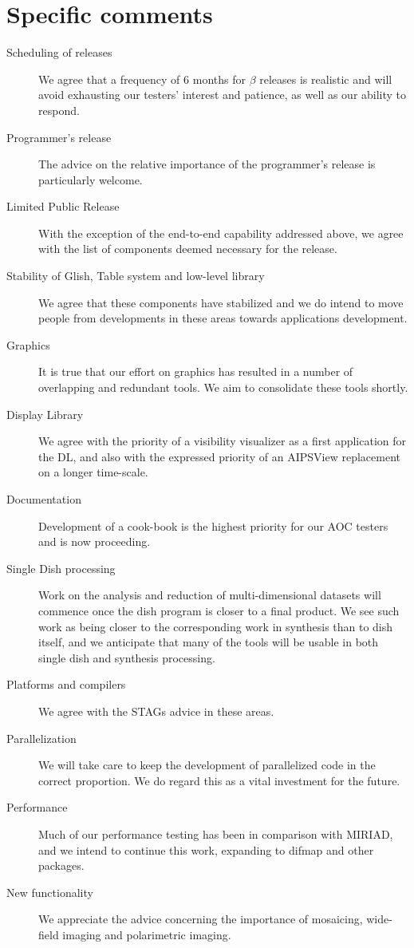 \section{Specific comments}

\begin{description}
\item[Scheduling of releases] We agree that a frequency of 6 months
for $\beta$ releases is realistic and will avoid exhausting
our testers' interest and patience, as well as our ability to
respond.
\item[Programmer's release] The advice on the relative importance
of the programmer's release is particularly welcome.
\item[Limited Public Release] With the exception of the end-to-end
capability addressed above, we agree with the list of components
deemed necessary for the release.
\item[Stability of Glish, Table system and low-level library] We 
agree that these components have stabilized and we do intend
to move people from developments in these areas towards applications
development.
\item[Graphics] It is true that our effort on graphics
has resulted in a number of overlapping and redundant tools. We aim
to consolidate these tools shortly.
\item[Display Library] We agree with the priority of a visibility
visualizer as a first application for the DL, and also with
the expressed priority of an AIPSView replacement on a longer
time-scale.
\item[Documentation] Development of a cook-book
is the highest priority for our AOC testers and is now proceeding.
\item[Single Dish processing] Work on the analysis and
reduction of multi-dimensional datasets will commence once
the dish program is closer to a final product. We see such work
as being closer to the corresponding work in synthesis than
to dish itself, and we anticipate that many of the tools
will be usable in both single dish and synthesis processing.
\item[Platforms and compilers] We agree with the STAGs advice in
these areas.
\item[Parallelization] We will take care to keep the development
of parallelized code in the correct proportion. We do regard
this as a vital investment for the future.
\item[Performance] Much of our performance testing has been
in comparison with MIRIAD, and we intend to continue this
work, expanding to difmap and other packages.
\item[New functionality] We appreciate the advice concerning
the importance of mosaicing, wide-field imaging and
polarimetric imaging.
\end{description}

